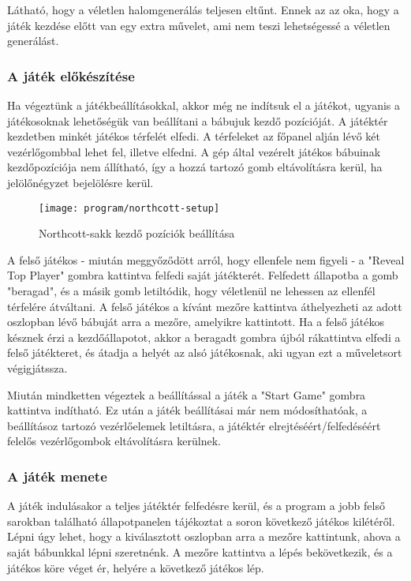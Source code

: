 Látható, hogy a véletlen halomgenerálás teljesen eltűnt. Ennek az az oka, hogy a játék kezdése előtt van egy extra művelet, ami nem teszi lehetségessé a véletlen generálást.

\subsubsection*{A játék előkészítése}
Ha végeztünk a játékbeállításokkal, akkor még ne indítsuk el a játékot, ugyanis a játékosoknak lehetőségük van beállítani a bábujuk kezdő pozícióját. A játéktér kezdetben minkét játékos térfelét elfedi. A térfeleket az főpanel alján lévő két vezérlőgombbal lehet fel, illetve elfedni. A gép által vezérelt játékos bábuinak kezdőpozíciója nem állítható, így a hozzá tartozó gomb eltávolításra kerül, ha jelölőnégyzet bejelölésre kerül.\ujsor

\begin{figure}[ht]
	\texttt{[image: program/northcott-setup]}
	\centering
	\caption{Northcott-sakk kezdő pozíciók beállítása}
	\label{fig:northcott-setup}
\end{figure}

A felső játékos - miután meggyőződött arról, hogy ellenfele nem figyeli - a "Reveal Top Player" gombra kattintva felfedi saját játékterét. Felfedett állapotba a gomb "beragad", és a másik gomb letiltódik, hogy véletlenül ne lehessen az ellenfél térfelére átváltani. A felső játékos a kívánt mezőre kattintva áthelyezheti az adott oszlopban lévő bábuját arra a mezőre, amelyikre kattintott. Ha a felső játékos késznek érzi a kezdőállapotot, akkor a beragadt gombra újból rákattintva elfedi a felső játékteret, és átadja a helyét az alsó játékosnak, aki ugyan ezt a műveletsort végigjátssza. \ujsor

Miután mindketten végeztek a beállítással a játék a "Start Game" gombra kattintva indítható. Ez után a játék beállításai már nem módosíthatóak, a beállításoz tartozó vezérlőelemek letiltásra, a játéktér elrejtéséért/felfedéséért felelős vezérlőgombok eltávolításra kerülnek.


\subsubsection*{A játék menete}
A játék indulásakor a teljes játéktér felfedésre kerül, és a program a jobb felső sarokban található állapotpanelen tájékoztat a soron következő játékos kilétéről. Lépni úgy lehet, hogy a kiválasztott oszlopban arra a mezőre kattintunk, ahova a saját bábunkkal lépni szeretnénk. A mezőre kattintva a lépés bekövetkezik, és a játékos köre véget ér, helyére a következő játékos lép.\ujsor

